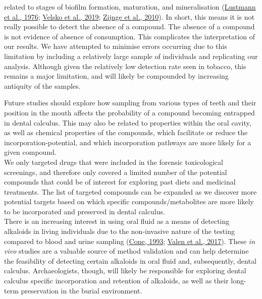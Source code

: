 \documentclass[
  letterpaper,
]{book}
\begin{document}
related to stages of biofilm formation, maturation, and mineralisation
(\protect\hyperlink{ref-lustmannScanningElectron1976}{Lustmann et al.,
1976}; \protect\hyperlink{ref-velskoMicrobialDifferences2019}{Velsko et
al., 2019}; \protect\hyperlink{ref-zijngeBiofilmArchitecture2010}{Zijnge
et al., 2010}). In short, this means it is not really possible to detect
the absence of a compound. The absence of a compound is not evidence of
absence of consumption. This complicates the interpretation of our
results. We have attempted to minimise errors occurring due to this
limitation by including a relatively large sample of individuals and
replicating our analysis. Although given the relatively low detection
rate seen in tobacco, this remains a major limitation, and will likely
be compounded by increasing antiquity of the samples.

Future studies should explore how sampling from various types of teeth
and their position in the mouth affects the probability of a compound
becoming entrapped in dental calculus. This may also be related to
properties within the oral cavity, as well as chemical properties of the
compounds, which facilitate or reduce the incorporation-potential, and
which incorporation pathways are more likely for a given compound.\\
We only targeted drugs that were included in the forensic toxicological
screenings, and therefore only covered a limited number of the potential
compounds that could be of interest for exploring past diets and
medicinal treatments. The list of targeted compounds can be expanded as
we discover more potential targets based on which specific
compounds/metabolites are more likely to be incorporated and preserved
in dental calculus.\\
There is an increasing interest in using oral fluid as a means of
detecting alkaloids in living individuals due to the non-invasive nature
of the testing compared to blood and urine sampling
(\protect\hyperlink{ref-coneSalivaTesting1993}{Cone, 1993};
\protect\hyperlink{ref-valenDetermination212017}{Valen et al., 2017}).
These \emph{in vivo} studies are a valuable source of method validation
and can help determine the feasibility of detecting certain alkaloids in
oral fluid and, subsequently, dental calculus. Archaeologists, though,
will likely be responsible for exploring dental calculus specific
incorporation and retention of alkaloids, as well as their long-term
preservation in the burial environment.
\end{document}
